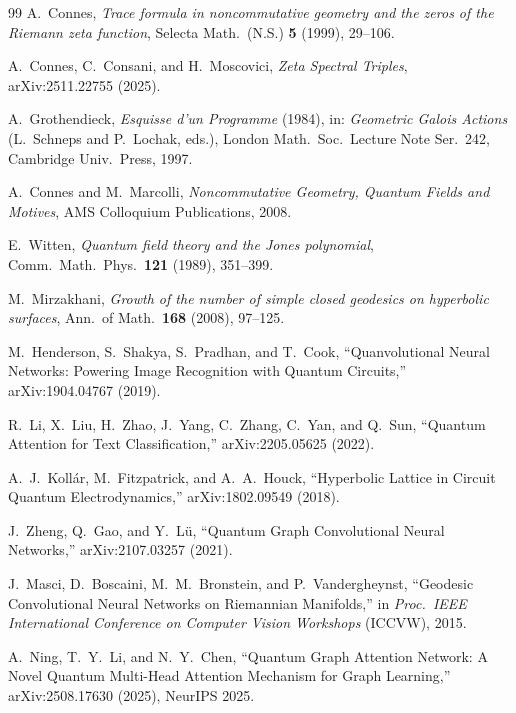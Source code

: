 \documentclass[11pt,oneside]{amsbook}
\numberwithin{equation}{section}
\theoremstyle{plain}
\theoremstyle{definition}
\theoremstyle{remark}
\begin{document}
\begin{thebibliography}{99}\setlength{\itemsep}{0.15em}
A.~Connes, \emph{Trace formula in noncommutative geometry and the zeros of the Riemann zeta function}, Selecta Math.\ (N.S.) \textbf{5} (1999), 29--106.

A.~Connes, C.~Consani, and H.~Moscovici, \emph{Zeta Spectral Triples}, arXiv:2511.22755 (2025).

A.~Grothendieck, \emph{Esquisse d'un Programme} (1984), in: \emph{Geometric Galois Actions} (L.~Schneps and P.~Lochak, eds.), London Math.\ Soc.\ Lecture Note Ser.\ 242, Cambridge Univ.\ Press, 1997.

A.~Connes and M.~Marcolli, \emph{Noncommutative Geometry, Quantum Fields and Motives}, AMS Colloquium Publications, 2008.

E.~Witten, \emph{Quantum field theory and the Jones polynomial}, Comm.\ Math.\ Phys.\ \textbf{121} (1989), 351--399.

M.~Mirzakhani, \emph{Growth of the number of simple closed geodesics on hyperbolic surfaces}, Ann.\ of Math.\ \textbf{168} (2008), 97--125.

M.~Henderson, S.~Shakya, S.~Pradhan, and T.~Cook,
\newblock ``Quanvolutional Neural Networks: Powering Image Recognition with Quantum Circuits,''
\newblock arXiv:1904.04767 (2019).

R.~Li, X.~Liu, H.~Zhao, J.~Yang, C.~Zhang, C.~Yan, and Q.~Sun,
\newblock ``Quantum Attention for Text Classification,''
\newblock arXiv:2205.05625 (2022).

A.~J.~Koll\'ar, M.~Fitzpatrick, and A.~A.~Houck,
\newblock ``Hyperbolic Lattice in Circuit Quantum Electrodynamics,''
\newblock arXiv:1802.09549 (2018).


J.~Zheng, Q.~Gao, and Y.~L\"u,
\newblock ``Quantum Graph Convolutional Neural Networks,''
\newblock arXiv:2107.03257 (2021).

J.~Masci, D.~Boscaini, M.~M.~Bronstein, and P.~Vandergheynst,
\newblock ``Geodesic Convolutional Neural Networks on Riemannian Manifolds,''
\newblock in \emph{Proc.\ IEEE International Conference on Computer Vision Workshops} (ICCVW), 2015.

A.~Ning, T.~Y.~Li, and N.~Y.~Chen,
\newblock ``Quantum Graph Attention Network: A Novel Quantum Multi-Head Attention Mechanism for Graph Learning,''
\newblock arXiv:2508.17630 (2025), NeurIPS 2025.


\end{thebibliography}
\end{document}
